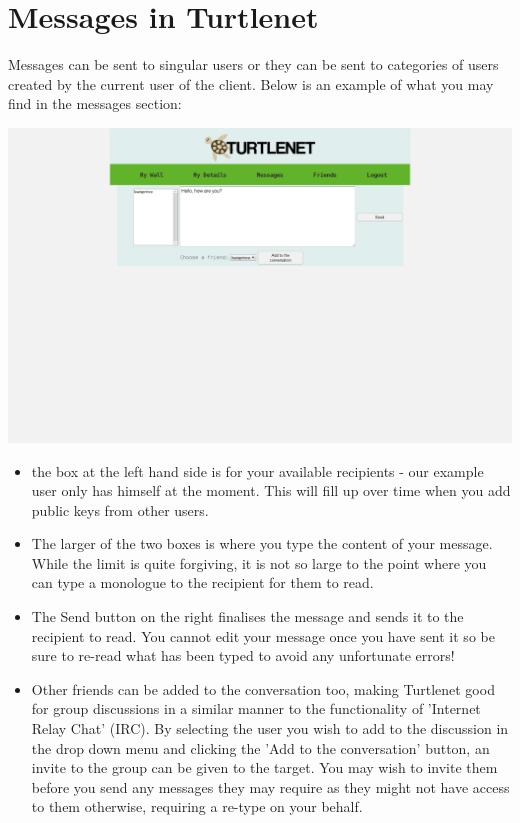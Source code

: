 \section{Messages in Turtlenet}
Messages can be sent to singular users or they can be sent to categories of
users created by the current user of the client.  Below is an example of what
you may find in the messages section:

\includegraphics[scale=0.2]{../Screenshots/Screenshot from 2014-04-29 22-30-50}

\begin{itemize}
\item the box at the left hand side is for your available recipients - our
      example user only has himself at the moment.  This will fill up over time
      when you add public keys from other users.
\item The larger of the two boxes is where you type the content of your message.
      While the limit is quite forgiving, it is not so large to the point where
      you can type a monologue to the recipient for them to read.
\item The Send button on the right finalises the message and sends it to the
      recipient to read.  You cannot edit your message once you have sent it
      so be sure to re-read what has been typed to avoid any unfortunate errors!
\item Other friends can be added to the conversation too, making Turtlenet good
      for group discussions in a similar manner to the functionality of 
      'Internet Relay Chat' (IRC).  By selecting the user you wish to add to the
      discussion in the drop down menu and clicking the 'Add to the 
      conversation' button, an invite to the group can be given to the target.
      You may wish to invite them before you send any messages they may require
      as they might not have access to them otherwise, requiring a re-type on
      your behalf.
\end{itemize}

